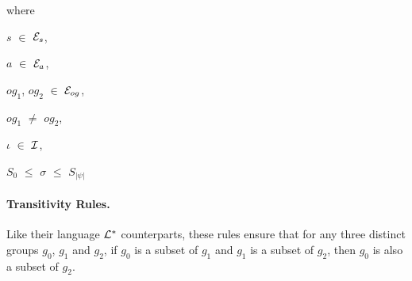 \documentclass[11pt]{report}
\newenvironment{vquote}
{
  \begin{list}{}{\leftmargin 1em}\item[]
}
{
  \end{list}
}
\begin{document}
\begin{enumerate}
                  \begin{vquote}
                    where

                    \hspace{1em}
                    $s$ $\in$ ${\cal E}_{s}$,

                    \hspace{1em}
                    $a$ $\in$ ${\cal E}_{a}$,

                    \hspace{1em}
                    $og_1$, $og_2$ $\in$ ${\cal E}_{og}$,

                    \hspace{1em}
                    $og_1$ $\neq$ $og_2$,

                    \hspace{1em}
                    $\iota$ $\in$ ${\cal I}$,

                    \hspace{1em}
                    $S_{0}$ $\leq$ $\sigma$ $\leq$ $S_{|\psi|}$
                  \end{vquote}
              \end{enumerate}

          \paragraph
            {\bf Transitivity Rules.}

            Like their language ${\cal L^*}$ counterparts, these rules ensure
            that for any three distinct groups $g_0$, $g_1$ and $g_2$, if
            $g_0$ is a subset of $g_1$ and $g_1$ is a subset of $g_2$, then
            $g_0$ is also a subset of $g_2$.
\end{document}
